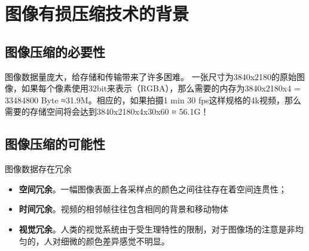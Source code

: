 \chapter{图像有损压缩技术的背景}

\section{图像压缩的必要性}

图像数据量庞大，给存储和传输带来了许多困难。
一张尺寸为3840x2180的原始图像，如果每个像素使用32bit来表示（RGBA），那么需要的内存为3840x2180x4 = 33484800 Byte ≈31.9M。相应的，如果拍摄1 min 30 fps这样规格的4k视频，那么需要的存储空间将会达到3840x2180x4x30x60 ≈ 56.1G！


\section{图像压缩的可能性}

图像数据存在冗余

\begin{itemize}
    \item \textbf{空间冗余}。一幅图像表面上各采样点的颜色之间往往存在着空间连贯性；
    \item \textbf{时间冗余}。视频的相邻帧往往包含相同的背景和移动物体
    \item \textbf{视觉冗余}。人类的视觉系统由于受生理特性的限制，对于图像场的注意是非均匀的，人对细微的颜色差异感觉不明显。
\end{itemize}